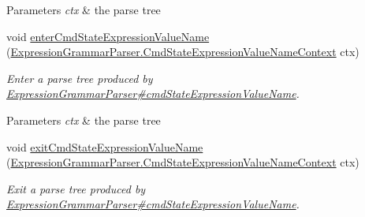 \begin{DoxyCompactItemize}
\begin{DoxyCompactList}
\begin{DoxyParams}{Parameters}
{\em ctx} & the parse tree\\
\hline
\end{DoxyParams}
 \end{DoxyCompactList}\item 
void \hyperlink{classgov_1_1nasa_1_1jpf_1_1inspector_1_1server_1_1expression_1_1parser_1_1_expression_grammar_base_listener_a4e64daf404696523cdd45abed7134ce7}{enter\+Cmd\+State\+Expression\+Value\+Name} (\hyperlink{classgov_1_1nasa_1_1jpf_1_1inspector_1_1server_1_1expression_1_1parser_1_1_expression_grammar_pa79fe925a020ecc7299d05e3047f2cfe9}{Expression\+Grammar\+Parser.\+Cmd\+State\+Expression\+Value\+Name\+Context} ctx)
\begin{DoxyCompactList}\small\item\em Enter a parse tree produced by \hyperlink{classgov_1_1nasa_1_1jpf_1_1inspector_1_1server_1_1expression_1_1parser_1_1_expression_grammar_parser_ab7b7d7ff1d67db1969528b9cb4557d4e}{Expression\+Grammar\+Parser\#cmd\+State\+Expression\+Value\+Name}.


\begin{DoxyParams}{Parameters}
{\em ctx} & the parse tree\\
\hline
\end{DoxyParams}
 \end{DoxyCompactList}\item 
void \hyperlink{classgov_1_1nasa_1_1jpf_1_1inspector_1_1server_1_1expression_1_1parser_1_1_expression_grammar_base_listener_acaee965ecb291e3e18ead8e1a8d88a1d}{exit\+Cmd\+State\+Expression\+Value\+Name} (\hyperlink{classgov_1_1nasa_1_1jpf_1_1inspector_1_1server_1_1expression_1_1parser_1_1_expression_grammar_pa79fe925a020ecc7299d05e3047f2cfe9}{Expression\+Grammar\+Parser.\+Cmd\+State\+Expression\+Value\+Name\+Context} ctx)
\begin{DoxyCompactList}\small\item\em Exit a parse tree produced by \hyperlink{classgov_1_1nasa_1_1jpf_1_1inspector_1_1server_1_1expression_1_1parser_1_1_expression_grammar_parser_ab7b7d7ff1d67db1969528b9cb4557d4e}{Expression\+Grammar\+Parser\#cmd\+State\+Expression\+Value\+Name}.



\end{DoxyCompactList}
\end{DoxyCompactItemize}
